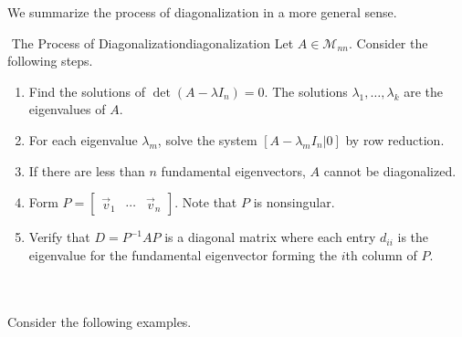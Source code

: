         We summarize the process of diagonalization in a more general sense.
        \begin{theorem}{\Stop\,\,The Process of Diagonalization}{diagonalization}
            Let \(A\in\mathcal{M}_{nn}\). Consider the following steps.
            \begin{enumerate}
                \item Find the solutions of \(\det(A-\lambda I_n)=0\). The solutions \(\lambda_1,\ldots,\lambda_k\) are the eigenvalues of \(A\).
                \item For each eigenvalue \(\lambda_m\), solve the system \([A-\lambda_mI_n|0]\) by row reduction.
                \item If there are less than \(n\) fundamental eigenvectors, \(A\) cannot be diagonalized.
                \item Form \(P=\begin{bmatrix} \vec{v}_1 & \cdots & \vec{v}_n \end{bmatrix}\). Note that \(P\) is nonsingular.
                \item Verify that \(D=P^{-1}AP\) is a diagonal matrix where each entry \(d_{ii}\) is the eigenvalue for the fundamental eigenvector forming the \(i\)th column of \(P\).
            \end{enumerate}
        \end{theorem}
        \pagebreak
        \vphantom
        \\
        \\
        Consider the following examples.
